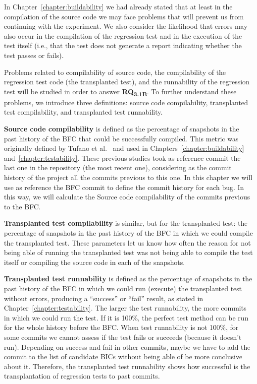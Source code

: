 In Chapter~\ref{chapter:buildability} we had already stated that at least in the compilation of the source code we may face problems that will prevent us from continuing with the experiment. 
We also consider the likelihood that errors may also occur in the compilation of the regression test and in the execution of the test itself (i.e., that the test does not generate a report indicating whether the test passes or fails).

Problems related to compilability of source code, the compilability of the regression test code (the transplanted test), and the runnability of the regression test will be studied in order to answer \textbf{RQ\textsubscript{3.1B}}. 
To further understand these problems, we introduce three definitions: source code compilability, transplanted test compilability, and transplanted test runnability.

\textbf{Source code compilability} is defined as the percentage of snapshots in the past history of the BFC that could be successfully compiled.
This metric was originally defined by Tufano et al.~\cite{tufano2017there} and used in Chapters~\ref{chapter:buildability} and~\ref{chapter:testability}.
These previous studies took as reference commit the last one in the repository (the most recent one), considering as the commit history of the project all the commits previous to this one. 
In this chapter we will use as reference the BFC commit to define the commit history for each bug. In this way, we will calculate the Source code compilability of the commits previous to the BFC.

\textbf{Transplanted test compilability} is similar, but for the transplanted test: the percentage of snapshots in the past history of the BFC in which we could compile the transplanted test. 
These parameters let us know how often the reason for not being able of running the transplanted test was not being able to compile the test itself or compiling the source code in each of the snapshots.

\textbf{Transplanted test runnability} is defined as the percentage of snapshots in the past history of the BFC in which we could run (execute) the transplanted test without errors, producing a ``success'' or ``fail'' result, as stated in Chapter~\ref{chapter:testability}. The larger the test runnability, the more commits in which we could run the test. If it is 100\%, the perfect test method can be run for the whole history before the BFC. When test runnability is not 100\%, for some commits we cannot assess if the test fails or succeeds (because it doesn't run). Depending on success and fail in other commits, maybe we have to add the commit to the list of candidate BICs without being able of be more conclusive about it. Therefore, the transplanted test runnability shows how successful is the transplantation of regression tests to past commits.

